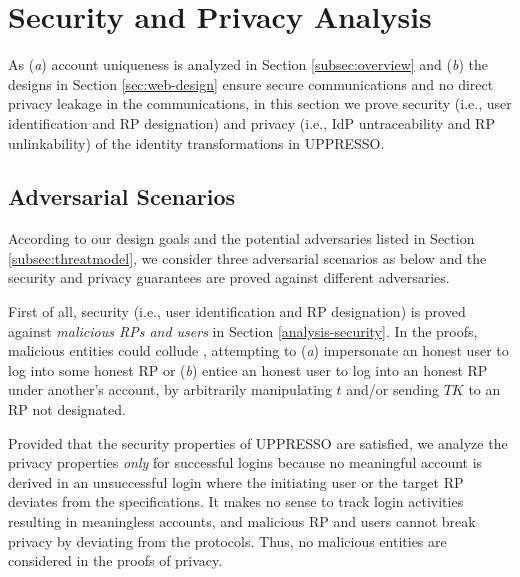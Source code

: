 \section{Security and Privacy Analysis}
\label{sec:analysis}

As (\emph{a}) account uniqueness is analyzed in Section \ref{subsec:overview}
    and (\emph{b}) the designs in Section \ref{sec:web-design} ensure secure communications and no direct privacy leakage in the communications,
in this section we prove security (i.e., user identification and RP designation) and privacy (i.e., IdP untraceability and RP unlinkability) of the identity transformations in UPPRESSO.


\subsection{Adversarial Scenarios}

According to our design goals %
 and the potential adversaries listed in Section \ref{subsec:threatmodel}, we consider three adversarial scenarios as below
 and the security and privacy guarantees are proved against different adversaries.


First of all, security (i.e., user identification and RP designation) is proved against \emph{malicious RPs and users} in Section \ref{analysis-security}.
In the proofs, malicious entities could collude \cite{FettKS14,BrowserID,SPRESSO},
  attempting to (\emph{a}) impersonate an honest user to log into some honest RP
   or (\emph{b}) entice an honest user to log into an honest RP under another's account, 
by arbitrarily manipulating $t$ and/or sending $TK$ to an RP not designated.

Provided that the security properties of UPPRESSO are satisfied,
    we analyze the privacy properties \emph{only} for successful logins
    because no meaningful account is derived in an unsuccessful login
where the initiating user or the target RP deviates from the specifications.
It makes no sense to track login activities resulting in meaningless accounts, and
    malicious RP and users cannot break privacy by deviating from the protocols.
Thus, no malicious entities are considered in the proofs of privacy.


